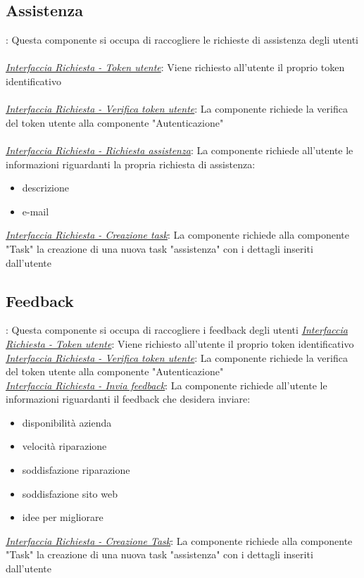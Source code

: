\documentclass{report}
\begin{document}
\subsection*{Assistenza}:
Questa componente si occupa di raccogliere le richieste di assistenza degli utenti\\\\
\uline{\textit{Interfaccia Richiesta - Token utente}}: 
Viene richiesto all'utente il proprio token identificativo\\\\
\uline{\textit{Interfaccia Richiesta - Verifica token utente}}:
La componente richiede la verifica del token utente alla componente "Autenticazione"\\\\
\uline{\textit{Interfaccia Richiesta - Richiesta assistenza}}:
La componente richiede all'utente le informazioni riguardanti la propria richiesta di assistenza:
\begin{itemize}
	\item descrizione
	\item e-mail
\end{itemize}
\uline{\textit{Interfaccia Richiesta - Creazione task}}:
La componente richiede alla componente "Task" la creazione di una nuova task "assistenza" con i dettagli inseriti dall'utente

\subsection*{Feedback}:
Questa componente si occupa di raccogliere i feedback degli utenti
\uline{\textit{Interfaccia Richiesta - Token utente}}: 
Viene richiesto all'utente il proprio token identificativo\\
\uline{\textit{Interfaccia Richiesta - Verifica token utente}}:
La componente richiede la verifica del token utente alla componente "Autenticazione"\\
\uline{\textit{Interfaccia Richiesta - Invia feedback}}:
La componente richiede all'utente le informazioni riguardanti il feedback che desidera inviare:
\begin{itemize}
	\item disponibilità azienda
	\item velocità riparazione
	\item soddisfazione riparazione
	\item soddisfazione sito web
	\item idee per migliorare
\end{itemize}
\uline{\textit{Interfaccia Richiesta - Creazione Task}}:
La componente richiede alla componente "Task" la creazione di una nuova task "assistenza" con i dettagli inseriti dall'utente
\end{document}
